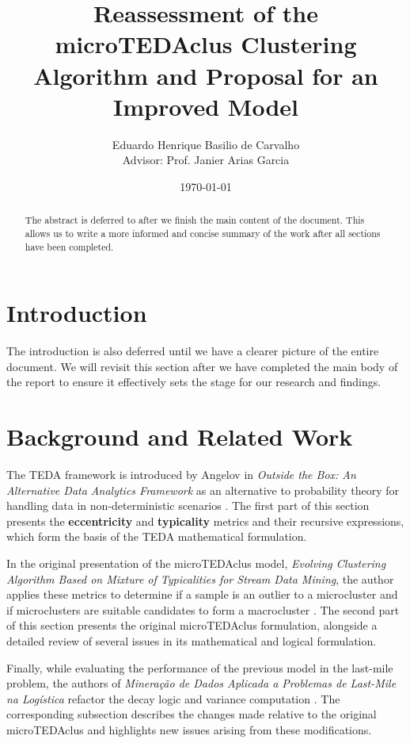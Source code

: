 \documentclass[a4paper]{article}
\title{Reassessment of the microTEDAclus Clustering Algorithm and Proposal for an Improved Model}
\author{Eduardo Henrique Basilio de Carvalho \\ Advisor: Prof. Janier Arias Garcia}
\date{\today}
\begin{document}
\maketitle

\begin{abstract}
    The abstract is deferred to after we finish the main content of the document. This allows us to write a more informed and concise summary of the work after all sections have been completed.
\end{abstract}

\section{Introduction}
The introduction is also deferred until we have a clearer picture of the entire document. We will revisit this section after we have completed the main body of the report to ensure it effectively sets the stage for our research and findings.

\section{Background and Related Work}

The TEDA framework is introduced by Angelov in \textit{Outside the Box: An Alternative Data Analytics Framework} as an alternative to probability theory for handling data in non-deterministic scenarios \cite{angelov2014outside}. The first part of this section presents the \textbf{eccentricity} and \textbf{typicality} metrics and their recursive expressions, which form the basis of the TEDA mathematical formulation.

In the original presentation of the microTEDAclus model, \textit{Evolving Clustering Algorithm Based on Mixture of Typicalities for Stream Data Mining}, the author applies these metrics to determine if a sample is an outlier to a microcluster and if microclusters are suitable candidates to form a macrocluster \cite{maia2020evolvclus}. The second part of this section presents the original microTEDAclus formulation, alongside a detailed review of several issues in its mathematical and logical formulation.

Finally, while evaluating the performance of the previous model in the last-mile problem, the authors of \textit{Mineração de Dados Aplicada a Problemas de Last-Mile na Logística} refactor the decay logic and variance computation \cite{galindo2021lastmile}. The corresponding subsection describes the changes made relative to the original microTEDAclus and highlights new issues arising from these modifications.
\end{document}
